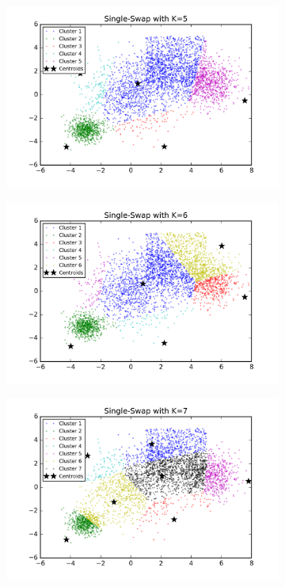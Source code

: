 \begin{description}
\begin{description}
\begin{figure}[!h]
\begin{subfigure}[b]{0.475\textwidth}
            \includegraphics[width=\textwidth]{./figures/bigClustering_singleSwap_5.png}
        \end{subfigure}
        \hfill
        \begin{subfigure}[b]{0.475\textwidth}   
            \centering 
            \includegraphics[width=\textwidth]{./figures/bigClustering_singleSwap_6.png}
        \end{subfigure}
        \begin{subfigure}[b]{0.475\textwidth}   
            \centering 
            \includegraphics[width=\textwidth]{./figures/bigClustering_singleSwap_7.png}

\end{subfigure}
\end{figure}
\end{description}
\end{description}
